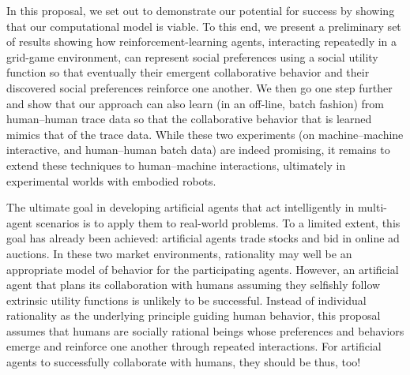 In this proposal, we set out to demonstrate our potential for success
by showing that our computational model is viable.  To this end,
we present a preliminary set of results showing how
reinforcement-learning agents, interacting repeatedly in a grid-game
environment, can represent social preferences using a social utility
function so that eventually their emergent collaborative behavior and
their discovered social preferences reinforce one another.  We then go
one step further and show that our approach can also learn (in an
off-line, batch fashion) from human--human trace data so that the
collaborative behavior that is learned mimics that of the trace data.
While these two experiments (on machine--machine interactive, and
human--human batch data) are indeed promising, it remains to extend
these techniques to human--machine interactions, ultimately in
experimental worlds with embodied robots.

The ultimate goal in developing artificial agents that act
intelligently in multi-agent scenarios is to apply them to real-world
problems.  To a limited extent, this goal has already been achieved:
artificial agents trade stocks and bid in online ad auctions.  In
these two market environments, rationality may well be an appropriate
model of behavior for the participating agents.  However,
an artificial agent that plans its collaboration with humans assuming
they selfishly follow extrinsic utility functions is unlikely to be
successful.  Instead of individual rationality as the underlying
principle guiding human behavior, this proposal assumes that humans
are socially rational beings whose preferences and behaviors emerge
and reinforce one another through repeated interactions.  For
artificial agents to successfully collaborate with humans, they should
be thus, too!

~\cite{gal04}
